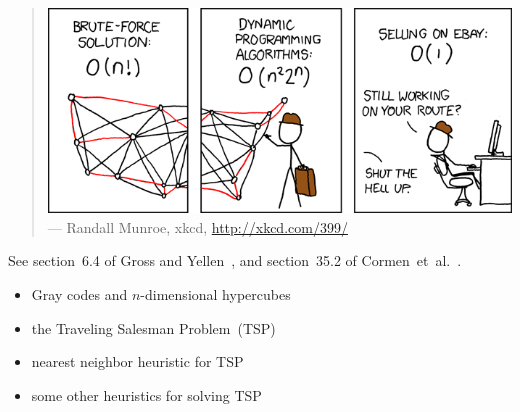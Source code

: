 \begin{quote}
\includegraphics[scale=0.5]{image/optimal-traversals/travelling-salesman-problem} \\
\noindent
--- Randall Munroe, xkcd,
\url{http://xkcd.com/399/}
\end{quote}

\noindent
See section~6.4 of Gross and Yellen~\cite{GrossYellen1999}, and
section~35.2 of Cormen~et~al.~\cite{CormenEtAl2001}.

\begin{itemize}
\item Gray codes and $n$-dimensional hypercubes

\item the Traveling Salesman Problem~(TSP)

\item nearest neighbor heuristic for TSP

\item some other heuristics for solving TSP
\end{itemize}

